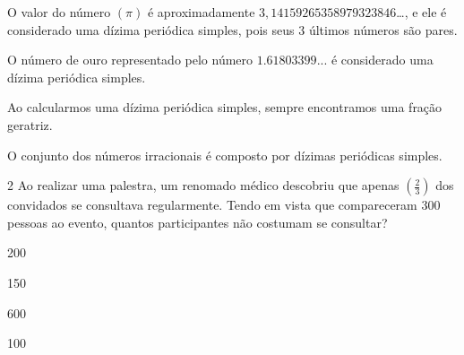 \begin{escolha}
\item O valor do número $(\pi)$ é aproximadamente
$3,14159265358979323846$\ldots, e ele é considerado uma dízima periódica
simples, pois seus 3 últimos números são pares.
\item O número de ouro representado pelo número $1.61803399$... é considerado
uma dízima periódica simples.
\item Ao calcularmos uma dízima periódica simples, sempre encontramos uma
fração geratriz.
\item O conjunto dos números irracionais é composto por dízimas periódicas
simples.
\end{escolha}







\num{2} Ao realizar uma palestra, um renomado médico descobriu que apenas
$(\frac{2}{3})$ dos convidados se consultava regularmente. Tendo em
vista que compareceram 300 pessoas ao evento, quantos participantes não
costumam se consultar?

\begin{escolha}
\item 200
\item 150
\item 600
\item 100
\end{escolha}



